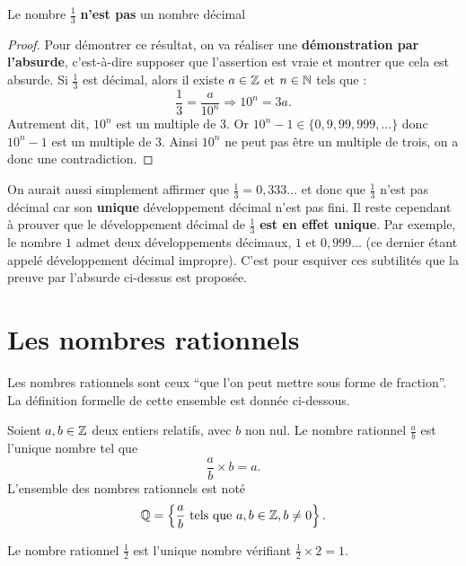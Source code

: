 \documentclass[a4paper, 12pt]{report}
\begin{document}
\begin{prop}
Le nombre $\frac{1}{3}$ \textbf{n'est pas} un nombre décimal
\end{prop}

\begin{proof}
Pour démontrer ce résultat, on va réaliser une \textbf{démonstration par l'absurde}, 
c'est-à-dire supposer que l'assertion est vraie et montrer que cela est absurde. 
Si $\frac{1}{3}$ est décimal, alors il existe $a \in \mathbb{Z}$ et $n \in \mathbb{N}$ tels que :
\[ \frac{1}{3} = \frac{a}{10^n} \Rightarrow 10^n=3a . \]
Autrement dit, $10^n$ est un multiple de $3$. Or $10^n-1 \in \{0, 9, 99, 999, \dots \}$ donc $10^n-1$ est un multiple de $3$. 
Ainsi $10^n$ ne peut pas être un multiple de trois, on a donc une contradiction.
\end{proof}

\begin{rmq}
On aurait aussi simplement affirmer que $\frac{1}{3} = 0,333 \dots$ et donc que $\frac{1}{3}$ n'est pas décimal car son \textbf{unique}
développement décimal n'est pas fini. Il reste cependant à prouver que le développement décimal de $\frac{1}{3}$ 
\textbf{est en effet unique}. 
Par exemple, le nombre $1$ admet deux développements décimaux, $1$ et $0,999 \dots$ 
(ce dernier étant appelé développement décimal impropre). 
C'est pour esquiver ces subtilités que la preuve par l'absurde ci-dessus est proposée.
\end{rmq}

\section{Les nombres rationnels}

Les nombres rationnels sont ceux ``que l'on peut mettre sous forme de fraction''. La définition formelle de cette ensemble est donnée ci-dessous.

\begin{defn}
Soient $a,b \in \mathbb{Z}$ deux entiers relatifs, avec $b$ non nul. Le nombre rationnel $\frac{a}{b}$ est l'unique nombre tel que 
\[ \frac{a}{b} \times b = a. \]
L'ensemble des nombres rationnels est noté 
\[ \mathbb{Q} = \left \{ \frac{a}{b} \text{ tels que } a, b \in \mathbb{Z}, b \neq 0 \right \}. \]
\end{defn}

\begin{ex}
Le nombre rationnel $\frac{1}{2}$ est l’unique nombre vérifiant $\frac{1}{2} \times 2 = 1$.
\end{ex}
\end{document}
